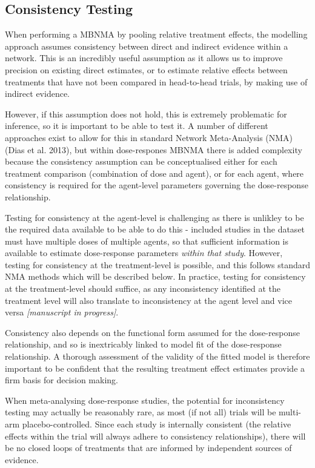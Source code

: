 \documentclass[]{article}
\begin{document}
\hypertarget{consistency-testing}{%
\subsection{Consistency Testing}\label{consistency-testing}}

When performing a MBNMA by pooling relative treatment effects, the
modelling approach assumes consistency between direct and indirect
evidence within a network. This is an incredibly useful assumption as it
allows us to improve precision on existing direct estimates, or to
estimate relative effects between treatments that have not been compared
in head-to-head trials, by making use of indirect evidence.

However, if this assumption does not hold, this is extremely problematic
for inference, so it is important to be able to test it. A number of
different approaches exist to allow for this in standard Network
Meta-Analysis (NMA) (Dias et al. 2013), but within dose-respones MBNMA
there is added complexity because the consistency assumption can be
conceptualised either for each treatment comparison (combination of dose
and agent), or for each agent, where consistency is required for the
agent-level parameters governing the dose-response relationship.

Testing for consistency at the agent-level is challenging as there is
unlikley to be the required data available to be able to do this -
included studies in the dataset must have multiple doses of multiple
agents, so that sufficient information is available to estimate
dose-response parameters \emph{within that study}. However, testing for
consistency at the treatment-level is possible, and this follows
standard NMA methods which will be described below. In practice, testing
for consistency at the treatment-level should suffice, as any
inconsistency identified at the treatment level will also translate to
inconsistency at the agent level and vice versa \emph{{[}manuscript in
progress{]}}.

Consistency also depends on the functional form assumed for the
dose-response relationship, and so is inextricably linked to model fit
of the dose-response relationship. A thorough assessment of the validity
of the fitted model is therefore important to be confident that the
resulting treatment effect estimates provide a firm basis for decision
making.

When meta-analysing dose-response studies, the potential for
inconsistency testing may actually be reasonably rare, as most (if not
all) trials will be multi-arm placebo-controlled. Since each study is
internally consistent (the relative effects within the trial will always
adhere to consistency relationships), there will be no closed loops of
treatments that are informed by independent sources of evidence.
\end{document}

